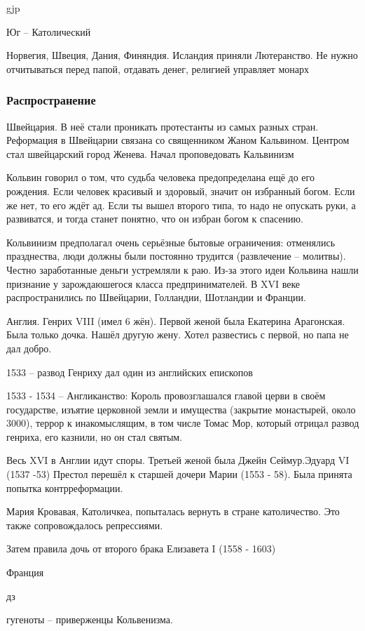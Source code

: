gjp	 \documentclass[12pt,a4paper]{article}
\begin{document}
Юг -- Католический

Норвегия, Швеция, Дания, Финяндия. Исландия приняли Лютеранство. Не нужно отчитываться перед папой, отдавать денег, религией управляет монарх

\subsubsection{Распространение}
Швейцария. В неё стали проникать протестанты из самых разных стран. Реформация в Швейцарии связана со священником Жаном Кальвином. Центром стал швейцарский город Женева. Начал проповедовать Кальвинизм

Кольвин говорил о том, что судьба человека предопределана ещё до его рождения. Если человек красивый и здоровый, значит он избранный богом. Если же нет, то его ждёт ад. Если ты вышел второго типа, то надо не опускать руки, а развиватся, и тогда станет понятно, что он избран богом к спасению.

Кольвинизм предполагал очень серьёзные бытовые ограничения: отменялись празднества, люди должны были постоянно трудится (развлечение -- молитвы). Честно заработанные деньги устремляли к раю. Из-за этого идеи Кольвина нашли признание у зарождаюшегося класса предпринимателей. В XVI веке распространились по Швейцарии, Голландии, Шотландии и Франции.

Англия. Генрих VIII (имел 6 жён). Первой женой была Екатерина Арагонская. Была только дочка. Нашёл другую жену. Хотел развестись с первой, но папа не дал добро.

1533 -- развод Генриху дал один из английских епископов

1533 - 1534 -- Англиканство: Король провозглашался главой церви в своём государстве, изъятие церковной земли и имущества (закрытие монастырей, около 3000), террор к инакомыслящим, в том числе Томас Мор, который отрицал развод генриха, его казнили, но он стал святым.

Весь XVI в Англии идут споры. Третьей женой была Джейн Сеймур.Эдуард VI (1537 -53) Престол перешёл к старшей дочери Марии (1553 - 58). Была принята попытка контрреформации. 

Мария Кровавая, Католичкеа, попыталась вернуть в стране католичество. Это также сопровождалось репрессиями.

Затем правила дочь от второго брака Елизавета I (1558 - 1603)

Франция 

дз

гугеноты -- приверженцы Кольвенизма.
\end{document}
